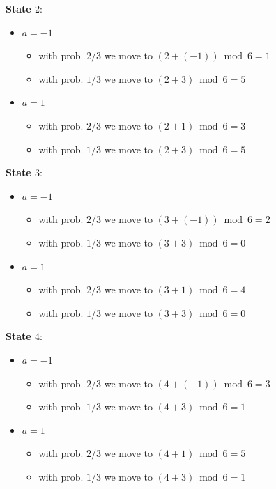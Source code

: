 
\textbf{State $2$}:

\begin{itemize}
    \item $a = -1$
    \begin{itemize}
        \item with prob. $2/3$ we move to $(2 + (-1)) \bmod 6 = 1$
        \item with prob. $1/3$ we move to $(2 + 3) \bmod 6 = 5$
    \end{itemize}
    \item $a = 1$
    \begin{itemize}
        \item with prob. $2/3$ we move to $(2 + 1) \bmod 6 = 3$
        \item with prob. $1/3$ we move to $(2 + 3) \bmod 6 = 5$
    \end{itemize}
\end{itemize}


\textbf{State $3$}:

\begin{itemize}
    \item $a = -1$
    \begin{itemize}
        \item with prob. $2/3$ we move to $(3 + (-1)) \bmod 6 = 2$
        \item with prob. $1/3$ we move to $(3 + 3) \bmod 6 = 0$
    \end{itemize}
    \item $a = 1$
    \begin{itemize}
        \item with prob. $2/3$ we move to $(3 + 1) \bmod 6 = 4$
        \item with prob. $1/3$ we move to $(3 + 3) \bmod 6 = 0$
    \end{itemize}
\end{itemize}


\textbf{State $4$}:

\begin{itemize}
    \item $a = -1$
    \begin{itemize}
        \item with prob. $2/3$ we move to $(4 + (-1)) \bmod 6 = 3$
        \item with prob. $1/3$ we move to $(4 + 3) \bmod 6 = 1$
    \end{itemize}
    \item $a = 1$
    \begin{itemize}
        \item with prob. $2/3$ we move to $(4 + 1) \bmod 6 = 5$
        \item with prob. $1/3$ we move to $(4 + 3) \bmod 6 = 1$
    \end{itemize}
\end{itemize}

